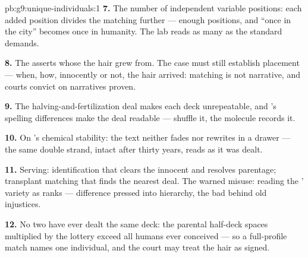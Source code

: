 \begin{solution}{pb:g9:unique-individuals:1}
\textbf{7.} The number of independent variable positions:
each added position divides the matching 
further --- enough positions, and ``once in the city''
becomes once in humanity. The lab reads as many as the
standard demands.

\textbf{8.} The  asserts whose  the hair
grew from. The case must still establish placement ---
when, how, innocently or not, the hair arrived: matching
is not narrative, and courts convict on narratives
proven.

\textbf{9.} The halving-and-fertilization deal makes each
deck unrepeatable, and 's spelling differences make
the deal readable ---  shuffle it, the
molecule records it.

\textbf{10.} On 's chemical stability: the text
neither fades nor rewrites in a drawer --- the same
double strand, intact after thirty years, reads as it was
dealt.

\textbf{11.} Serving: identification that clears the
innocent and resolves parentage; transplant matching that
finds the nearest deal. The warned misuse: reading the
' variety as ranks --- difference pressed into
hierarchy, the bad  behind old injustices.

\textbf{12.} No two  have ever dealt the
same deck: the parental half-deck spaces multiplied by
the  lottery exceed all humans ever conceived ---
so a full-profile match names one individual, and the
court may treat the hair as signed.
\end{solution}
